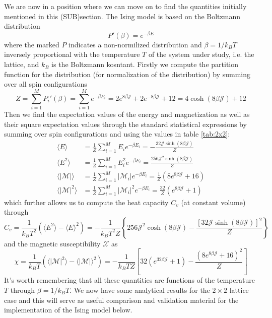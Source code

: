 \documentclass[12pt]{article}
\numberwithin{figure}{section}
\numberwithin{table}{section}
\begin{document}
\noindent We are now in a position where we can move on to find the quantities initially mentioned in this (SUB)section. The Ising model is based on the Boltzmann distribution \cite{Comp}
\begin{equation}
	P'(\beta)=e^{-\beta E} \label{eq:boltzmann_dist}
\end{equation}
where the marked $P$ indicates a non-normilized distribution and $\beta=1/k_BT$ inversely proportional with the temperature $T$ of the system under study, i.e. the lattice, and $k_B$ is the Boltzmann kosntant. Firstly we compute the partition function for the distribution (for normalization of the distribution) by summing over all spin configurations \cite{Comp}
\begin{equation}
	Z=\sum_{i=1}^MP_i'(\beta)=\sum_{i=1}^Me^{-\beta E_i}=2e^{8\beta\mathcal{J}}+2e^{-8\beta\mathcal{J}}+12=4\cosh(8\beta\mathcal{J})+12 \label{eq:Z_2x2}
\end{equation}
Then we find the expectation values of the energy and magnetization as well as their square expectation values through the standard statistical expressions by summing over spin configurations and using the values in table \ref{tab:2x2}:
\begin{align}
	\langle E \rangle&=\frac{1}{Z}\sum_{i=1}^ME_ie^{-\beta E_i}=-\frac{32\mathcal{J}\sinh(8\beta\mathcal{J})}{Z} \label{eq:E_2x2_avg}\\[0.20cm]
	\langle E^2 \rangle&=\frac{1}{Z}\sum_{i=1}^ME_i^2e^{-\beta E_i}=\frac{256\mathcal{J}^2\sinh(8\beta\mathcal{J})}{Z} \label{eq:E2_2x2_avg}\\[0.20cm]
	\langle |\mathcal{M}| \rangle&=\frac{1}{Z}\sum_{i=1}^M|\mathcal{M}_i|e^{-\beta E_i}=\frac{1}{Z}(8e^{8\beta\mathcal{J}}+16) \label{eq:M_2x2_avg}\\[0.20cm]
	\langle |\mathcal{M}|^2 \rangle&=\frac{1}{Z}\sum_{i=1}^M|\mathcal{M}_i|^2e^{-\beta E_i}=\frac{32}{Z}(e^{8\beta\mathcal{J}}+1) \label{eq:M2_2x2_avg}
\end{align}
which further allows us to compute the heat capacity $C_v$ (at constant volume) through \cite{Comp}
\begin{equation}
	C_v=\frac{1}{k_BT^2}\left(\langle E^2 \rangle-\langle E \rangle^2\right)=-\frac{1}{k_BT^2Z}\left\{256\mathcal{J}^2\cosh(8\beta\mathcal{J})-\frac{\left[32\mathcal{J}\sinh(8\beta\mathcal{J})\right]^2}{Z}\right\} \label{eq:Cv_2x2}
\end{equation}
and the magnetic susceptibility $\mathcal{X}$ as \cite{Comp}
\begin{equation}
	\chi=\frac{1}{k_BT}\left(\langle |\mathcal{M}|^2 \rangle-\langle |\mathcal{M}| \rangle^2\right)=-\frac{1}{k_BTZ}\left[32(e^{32\beta\mathcal{J}}+1)-\frac{(8e^{8\beta\mathcal{J}}+16)^2}{Z}\right] \label{eq:X_2x2}
\end{equation}
It's worth remembering that all these quantities are functions of the temperature $T$ through $\beta=1/k_BT$. We now have some analytical results for the $2\times2$ lattice case and this will serve as useful comparison and validation material for the implementation of the Ising model below.
\end{document}
